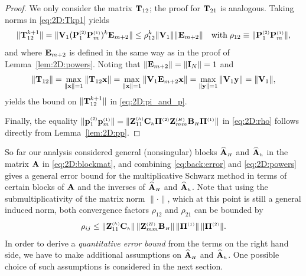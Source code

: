 \begin{proof}
We only consider the matrix $\mathbf{T}_{12}$; the proof for $\mathbf{T}_{21}$ is analogous.
Taking norms in \eqref{eq:2D:Tkp1} yields
%
\begin{equation*}
\|\mathbf{T}_{12}^{k+1}\|= \|\mathbf{V}_1(\mathbf{P}^{\scriptscriptstyle (2)}_{1}\mathbf{P}^{\scriptscriptstyle (1)}_{m})^{k}\mathbf{E}_{m+2}\|
\leq \rho_{12}^k \|\mathbf{V}_1\| \|\mathbf{E}_{m+2}\|\quad\text{with}\;\rho_{12}\equiv\|\mathbf{P}^{\scriptscriptstyle (2)}_{1}\mathbf{P}^{\scriptscriptstyle (1)}_{m}\|,
\end{equation*}
%
and where $\mathbf{E}_{m+2}$ is defined in the same way as in the proof of
Lemma~\ref{lem:2D:powers}. Noting that $\|\mathbf{E}_{m+2}\|=\|\mathbf{I}_N\|=1$ and
%
$$\|\mathbf{T}_{12}\|=\max_{\|\mathbf{x}\|=1}\|\mathbf{T}_{12}\mathbf{x}\|=\max_{\|\mathbf{x}\|=1}\|\mathbf{V}_1\mathbf{E}_{m+2}\mathbf{x}\|
=\max_{\|\mathbf{y}\|=1}\|\mathbf{V}_1\mathbf{y}\|=\|\mathbf{V}_1\|,$$
%
yields the bound on $\|\mathbf{T}_{12}^{k+1}\|$ in \eqref{eq:2D:pi_and_p}.

Finally, the equality
$\|\mathbf{p}^{\scriptscriptstyle (2)}_{1}\mathbf{p}^{\scriptscriptstyle (1)}_{m}\|=\|\mathbf{Z}_{11}^{\scriptscriptstyle (h)}\mathbf{C}_{\scriptscriptstyle h} \mathbf{\Pi}^{\scriptscriptstyle (2)}
\mathbf{Z}_{mm}^{\scriptscriptstyle (H)}\mathbf{B}_{\scriptscriptstyle H}\mathbf{\Pi}^{\scriptscriptstyle (1)}\|$ in \eqref{eq:2D:rho} follows directly
from Lemma~\ref{lem:2D:pp}.
%
\end{proof}



So far our analysis considered general (nonsingular) blocks $\widehat{\mathbf{A}}_{\scriptscriptstyle H}$ and
$\widehat{\mathbf{A}}_{\scriptscriptstyle h}$ in the matrix $\mathbf{A}$ in \eqref{eq:2D:blockmat}, and combining \eqref{eq:back:error} and \eqref{eq:2D:powers} gives a general error bound for the multiplicative Schwarz method in terms of certain blocks of $\mathbf{A}$ and the inverses of $\widehat{\mathbf{A}}_{\scriptscriptstyle H}$ and $\widehat{\mathbf{A}}_{\scriptscriptstyle h}$. Note that using the
submultiplicativity of the matrix norm $\|\cdot\|$, which at this point is
still a general induced norm, both convergence factors $\rho_{12}$ and
$\rho_{21}$ can be bounded by
%
\begin{equation}\label{eq:2D:rhobound}
\rho_{ij}\leq \|\mathbf{Z}_{11}^{\scriptscriptstyle (h)}\mathbf{C}_{\scriptscriptstyle h}\|\,
\|\mathbf{Z}_{mm}^{\scriptscriptstyle (H)}\mathbf{B}_{\scriptscriptstyle H}\|\, \| \mathbf{\Pi}^{\scriptscriptstyle (1)}\|\,  \| \mathbf{\Pi}^{\scriptscriptstyle (2)}\|.
\end{equation}
%
In order to derive a \emph{quantitative error bound} from the terms on the
right hand side, we have to make additional assumptions on $\widehat{\mathbf{A}}_{\scriptscriptstyle H}$ and
$\widehat{\mathbf{A}}_{\scriptscriptstyle h}$. One possible choice of such assumptions is considered in the next
section.

